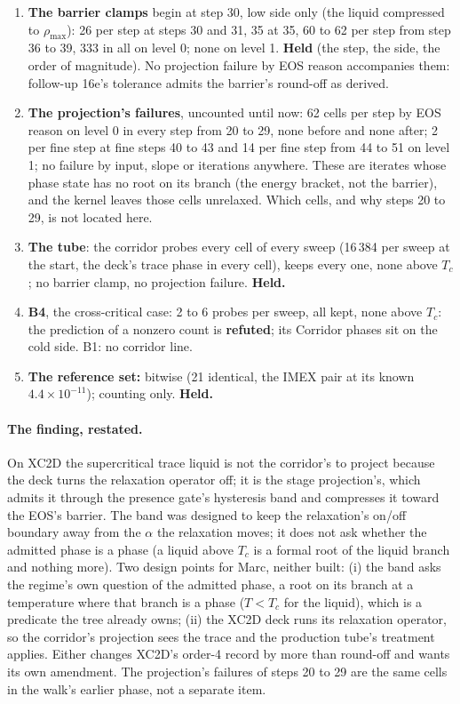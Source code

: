 \documentclass[11pt,a4paper]{article}
\begin{document}
\begin{enumerate}[nosep]
      kernel converges with the liquid at the ceiling.
\item \textbf{The barrier clamps} begin at step 30, low side only
      (the liquid compressed to $\rho_{\max}$): 26 per step at steps 30
      and 31, 35 at 35, 60 to 62 per step from step 36 to 39, 333 in
      all on level 0; none on level 1.  \textbf{Held} (the step, the
      side, the order of magnitude).  No projection failure by EOS
      reason accompanies them: follow-up 16e's tolerance admits the
      barrier's round-off as derived.
\item \textbf{The projection's failures}, uncounted until now: 62
      cells per step by EOS reason on level 0 in every step from 20 to
      29, none before and none after; 2 per fine step at fine steps 40
      to 43 and 14 per fine step from 44 to 51 on level 1; no failure by
      input, slope or iterations anywhere.  These are iterates whose
      phase state has no root on its branch (the energy bracket, not the
      barrier), and the kernel leaves those cells unrelaxed.  Which
      cells, and why steps 20 to 29, is not located here.
\item \textbf{The tube}: the corridor probes every cell of every sweep
      (16\,384 per sweep at the start, the deck's trace phase in every
      cell), keeps every one, none above $T_c$; no barrier clamp, no
      projection failure.  \textbf{Held.}
\item \textbf{B4}, the cross-critical case: 2 to 6 probes per sweep,
      all kept, none above $T_c$: the prediction of a nonzero count is
      \textbf{refuted}; its Corridor phases sit on the cold side.  B1:
      no corridor line.
\item \textbf{The reference set:} bitwise (21 identical, the IMEX pair at its known $4.4\times10^{-11}$); counting only.  \textbf{Held.}
\end{enumerate}

\paragraph{The finding, restated.}  On XC2D the supercritical trace
liquid is not the corridor's to project because the deck turns the
relaxation operator off; it is the stage projection's, which admits it
through the presence gate's hysteresis band and compresses it toward
the EOS's barrier.  The band was designed to keep the relaxation's
on/off boundary away from the $\alpha$ the relaxation moves; it does not
ask whether the admitted phase is a phase (a liquid above $T_c$ is a
formal root of the liquid branch and nothing more).  Two design points
for Marc, neither built: (i) the band asks the regime's own question of
the admitted phase, a root on its branch at a temperature where that
branch is a phase ($T < T_c$ for the liquid), which is a predicate the
tree already owns; (ii) the XC2D deck runs its relaxation operator, so
the corridor's projection sees the trace and the production tube's
treatment applies.  Either changes XC2D's order-4 record by more than
round-off and wants its own amendment.  The projection's failures of
steps 20 to 29 are the same cells in the walk's earlier phase, not a
separate item.
\end{document}
